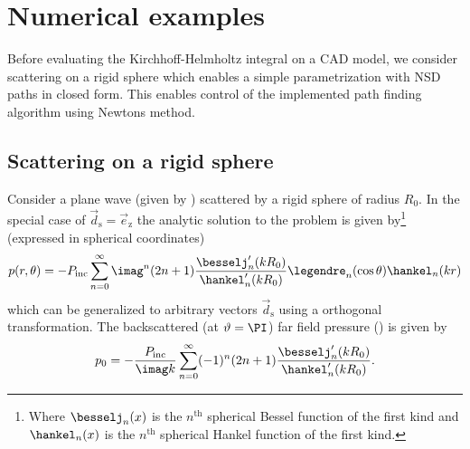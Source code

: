 \section{Numerical examples}
Before evaluating the Kirchhoff-Helmholtz integral on a CAD model, we consider scattering on a rigid sphere which enables a simple parametrization with NSD paths in closed form. This enables control of the implemented path finding algorithm using Newtons method.

\label{Sec4:resultsAndDiscussion}
\subsection{Scattering on a rigid sphere}
Consider a plane wave (given by ) scattered by a rigid sphere of radius $R_0$. In the special case of $\vec{d}_{\mathrm{s}}=\vec{e}_{\mathrm{z}}$ the analytic solution \cite{Venas2019e3s} to the problem is given by\footnote{Where $\besselj_n(x)$ is the $n^{\mathrm{th}}$ spherical Bessel function of the first kind and $\hankel_n(x)$ is the $n^{\mathrm{th}}$ spherical Hankel function of the first kind.} (expressed in spherical coordinates)
\begin{equation}\label{Eq4:analyticSolution}
	p(r,\theta) = -P_{\mathrm{inc}}\sum_{n=0}^\infty \imag^n (2n+1) \frac{\besselj_n'(kR_0)}{\hankel_n'(kR_0)} \legendre_n(\cos\theta)\hankel_n(kr)
\end{equation}
which can be generalized to arbitrary vectors $\vec{d}_{\mathrm{s}}$ using a orthogonal transformation. The backscattered (at $\vartheta=\PI$) far field pressure () is given by
\begin{equation}\label{Eq4:backscatteredSolution}
	p_0 = -\frac{P_{\mathrm{inc}}}{\imag k}\sum_{n=0}^\infty (-1)^n (2n+1) \frac{\besselj_n'(kR_0)}{\hankel_n'(kR_0)}.
\end{equation}

